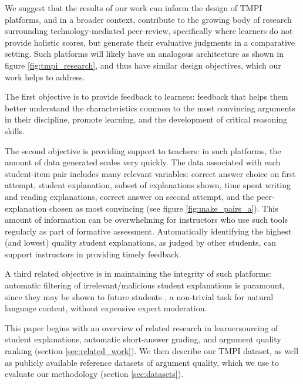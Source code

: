 \documentclass[notitlepage,12pt]{jedm}
\begin{document}

We suggest that the results of our work can inform the design of TMPI 
platforms, and in a broader context, contribute to the growing body of research 
surrounding technology-mediated peer-review, specifically where learners do not 
provide holistic scores, but generate their evaluative judgments in a 
comparative setting. 
Such platforms will likely have an analogous architecture as shown in figure 
\ref{fig:tmpi_research}, and thus have similar design objectives, which our 
work helps to address.

The first objective is to provide feedback to learners: feedback that helps 
them better understand the characteristics common to the most convincing 
arguments in their discipline, promote learning, and the development of 
critical reasoning skills.

The second objective is providing support to teachers: in such platforms, the 
amount of data generated scales very quickly.
The data associated with each student-item pair includes many relevant 
variables: correct answer choice on first attempt, student explanation, subset 
of explanations shown, time spent writing and reading explanations, correct 
answer on second attempt, and the peer-explanation chosen as most convincing 
(see figure \ref{fig:make_pairs_a}).   
This amount of information can be overwhelming for instructors who use such 
tools regularly as part of formative assessment. 
Automatically identifying the highest (and lowest) quality student 
explanations, as judged by other students, can support instructors in providing 
timely feedback. 

A third related objective is in maintaining the integrity of such platforms: 
automatic filtering of irrelevant/malicious student explanations is paramount, 
since they may be shown to future students \cite{gagnon_filtering_2019}, a 
non-trivial task for natural language content, without expensive expert 
moderation.

This paper begins with an overview of related research in learnersourcing of 
student explanations, automatic short-answer grading, and argument quality 
ranking (section \ref{sec:related_work}).
We then describe our TMPI dataset, as well as publicly available reference 
datasets of argument quality, which we use to evaluate our methodology (section 
\ref{sec:datasets}).
\end{document}
